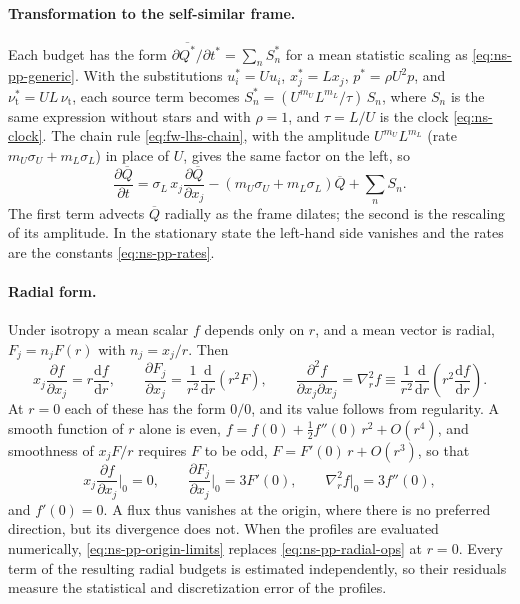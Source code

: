 \documentclass{article}
\begin{document}
\paragraph{Transformation to the self-similar frame.}
Each budget has the form
$\partial \overline{Q^*}/\partial t^* = \sum_n S_n^*$ for a mean statistic
scaling as \eqref{eq:ns-pp-generic}. With the substitutions
$u_i^* = U u_i$, $x_j^* = L x_j$, $p^* = \rho U^2 p$, and
$\nu_{\mathrm{t}}^* = UL\, \nu_{\mathrm{t}}$, each source term becomes
$S_n^* = (U^{m_U} L^{m_L}/\tau)\, S_n$, where $S_n$ is the same expression
without stars and with $\rho = 1$, and $\tau = L/U$ is the clock
\eqref{eq:ns-clock}. The chain rule \eqref{eq:fw-lhs-chain}, with the
amplitude $U^{m_U} L^{m_L}$ (rate $m_U \sigma_U + m_L \sigma_L$) in place of
$U$, gives the same factor on the left, so
\begin{equation}\label{eq:ns-pp-budget-nondim}
  \frac{\partial \overline{Q}}{\partial t}
  = \sigma_L\, x_j \frac{\partial \overline{Q}}{\partial x_j}
  - \left( m_U \sigma_U + m_L \sigma_L \right) \overline{Q}
  + \sum_n S_n .
\end{equation}
The first term advects $\overline{Q}$ radially as the frame dilates; the second
is the rescaling of its amplitude. In the stationary state the left-hand side
vanishes and the rates are the constants \eqref{eq:ns-pp-rates}.

\paragraph{Radial form.}
Under isotropy a mean scalar $f$ depends only on $r$, and a mean vector is
radial, $F_j = n_j F(r)$ with $n_j = x_j/r$. Then
\begin{equation}\label{eq:ns-pp-radial-ops}
  x_j \frac{\partial f}{\partial x_j} = r \frac{\mathrm{d} f}{\mathrm{d} r} ,
  \qquad
  \frac{\partial F_j}{\partial x_j} = \frac{1}{r^2} \frac{\mathrm{d}}{\mathrm{d} r}\left( r^2 F \right) ,
  \qquad
  \frac{\partial^2 f}{\partial x_j \partial x_j} = \nabla_r^2 f
  \equiv \frac{1}{r^2} \frac{\mathrm{d}}{\mathrm{d} r}\left( r^2 \frac{\mathrm{d} f}{\mathrm{d} r} \right) .
\end{equation}
At $r = 0$ each of these has the form $0/0$, and its value follows from
regularity. A smooth function of $r$ alone is even,
$f = f(0) + \tfrac12 f''(0)\, r^2 + O(r^4)$, and smoothness of
$x_j F/r$ requires $F$ to be odd, $F = F'(0)\, r + O(r^3)$, so that
\begin{equation}\label{eq:ns-pp-origin-limits}
  x_j \frac{\partial f}{\partial x_j} \bigg|_0 = 0 ,
  \qquad
  \frac{\partial F_j}{\partial x_j} \bigg|_0 = 3 F'(0) ,
  \qquad
  \nabla_r^2 f \big|_0 = 3 f''(0) ,
\end{equation}
and $f'(0) = 0$. A flux thus vanishes at the origin, where there is no
preferred direction, but its divergence does not. When the profiles are
evaluated numerically, \eqref{eq:ns-pp-origin-limits} replaces
\eqref{eq:ns-pp-radial-ops} at $r = 0$. Every term of the resulting radial
budgets is estimated independently, so their residuals measure the
statistical and discretization error of the profiles.
\end{document}

